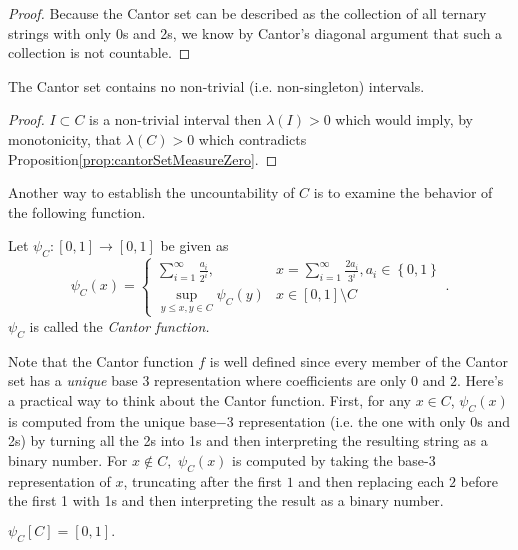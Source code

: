 \begin{proof}
Because the Cantor set can be described as the collection of all ternary
strings with only 0s and 2s, we know by Cantor's diagonal argument
that such a collection is not countable.
\end{proof}
\begin{prop}
\label{prop:cantorSetDisconnected}The Cantor set contains no non-trivial
(i.e. non-singleton) intervals.
\end{prop}

\begin{proof}
$I\subset C$ is a non-trivial interval then $\lambda\left(I\right)>0$
which would imply, by monotonicity, that $\lambda\left(C\right)>0$
which contradicts Proposition\ref{prop:cantorSetMeasureZero}.
\end{proof}
Another way to establish the uncountability of $C$ is to examine
the behavior of the following function.
\begin{defn}
\label{def:cantorFunction}Let $\psi_{C}:\left[0,1\right]\to\left[0,1\right]$
be given as
\[
\psi_{C}\left(x\right)=\begin{cases}
\sum_{i=1}^{\infty}\frac{a_{i}}{2^{i}}, & x=\sum_{i=1}^{\infty}\frac{2a_{i}}{3^{i}},a_{i}\in\left\{ 0,1\right\} \\
\sup_{y\leq x,y\in C}\psi_{C}\left(y\right) & x\in\left[0,1\right]\setminus C
\end{cases}.
\]
$\psi_{C}$ is called the \emph{Cantor function.}
\end{defn}

Note that the Cantor function $f$ is well defined since every member
of the Cantor set has a \emph{unique }base 3 representation where
coefficients are only $0$ and $2$. Here's a practical way to think
about the Cantor function. First, for any $x\in C$, $\psi_{C}\left(x\right)$
is computed from the unique base$-3$ representation (i.e. the one
with only 0s and 2s) by turning all the 2s into 1s and then interpreting
the resulting string as a binary number. For $x\notin C,$ $\psi_{C}\left(x\right)$
is computed by taking the base-$3$representation of $x$, truncating
after the first $1$ and then replacing each $2$ before the first
1 with 1s and then interpreting the result as a binary number.
\begin{prop}
\label{prop:imageCantorSetUnderCantorFunctionFull}$\psi_{C}\left[C\right]=\left[0,1\right].$
\end{prop}

